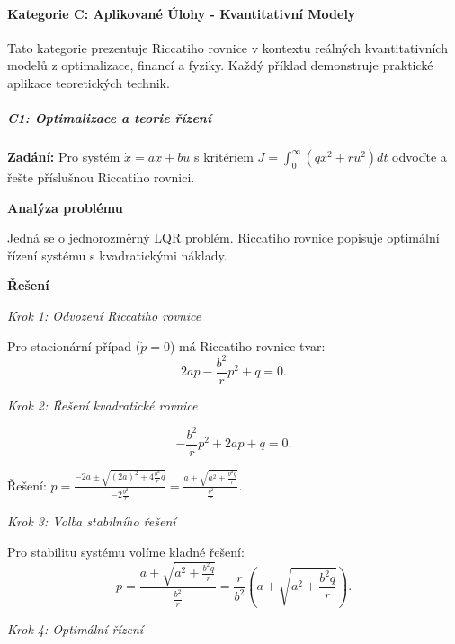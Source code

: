 \paragraph*{Kategorie C: Aplikované Úlohy - Kvantitativní Modely}
\label{par:kategorie-c-aplikovane}

Tato kategorie prezentuje Riccatiho rovnice v kontextu reálných kvantitativních modelů z optimalizace, financí a fyziky. Každý příklad demonstruje praktické aplikace teoretických technik.

\vspace{0.8\baselineskip}

\subparagraph*{C1: Optimalizace a teorie řízení}
\label{subpar:c1-optimalizace-rizeni}

\begin{example}
\label{ex:c1-lehky-lqr}

\noindent\textbf{Zadání:} Pro systém $\dot{x} = ax + bu$ s kritériem $J = \int_0^\infty (qx^2 + ru^2)dt$ odvoďte a řešte příslušnou Riccatiho rovnici.

\vspace{1.5\baselineskip}

\noindent\textbf{Analýza problému}

\noindent Jedná se o jednorozměrný LQR problém. Riccatiho rovnice popisuje optimální řízení systému s kvadratickými náklady.

\vspace{1.5\baselineskip}

\noindent\textbf{Řešení}

\noindent\textit{Krok 1: Odvození Riccatiho rovnice}

Pro stacionární případ ($\dot{p} = 0$) má Riccatiho rovnice tvar:
\[
2ap - \frac{b^2}{r}p^2 + q = 0.
\]

\noindent\textit{Krok 2: Řešení kvadratické rovnice}

\[
-\frac{b^2}{r}p^2 + 2ap + q = 0.
\]

Řešení: $p = \frac{-2a \pm \sqrt{(2a)^2 + 4\frac{b^2}{r}q}}{-2\frac{b^2}{r}} = \frac{a \pm \sqrt{a^2 + \frac{b^2q}{r}}}{\frac{b^2}{r}}$.

\noindent\textit{Krok 3: Volba stabilního řešení}

Pro stabilitu systému volíme kladné řešení:
\[
p = \frac{a + \sqrt{a^2 + \frac{b^2q}{r}}}{\frac{b^2}{r}} = \frac{r}{b^2}\left(a + \sqrt{a^2 + \frac{b^2q}{r}}\right).
\]

\noindent\textit{Krok 4: Optimální řízení}


\end{example}
